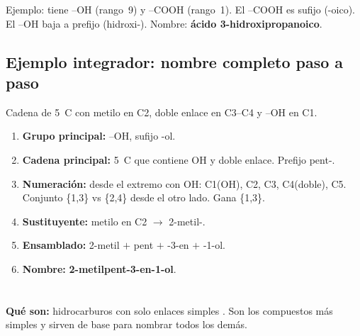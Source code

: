 Ejemplo:  tiene \mbox{--OH} (rango~9) y \mbox{--COOH} (rango~1).
El \mbox{--COOH} es sufijo (-oico). El \mbox{--OH} baja a prefijo (hidroxi-).
Nombre: \textbf{ácido 3-hidroxipropanoico}.

{}
\subsection*{\textcolor{blueunam}{Ejemplo integrador: nombre completo paso a paso}}

Cadena de 5~C con metilo en C2, doble enlace en C3--C4 y \mbox{--OH} en C1.

\begin{center}
\end{center}

\begin{enumerate}
\item \textbf{Grupo principal:} \mbox{--OH}, sufijo -ol.
\item \textbf{Cadena principal:} 5~C que contiene OH y doble enlace. Prefijo pent-.
\item \textbf{Numeración:} desde el extremo con OH: C1(OH), C2, C3, C4(doble), C5.
  Conjunto \{1,3\} vs \{2,4\} desde el otro lado. Gana \{1,3\}.
\item \textbf{Sustituyente:} metilo en C2 $\to$ 2-metil-.
\item \textbf{Ensamblado:} 2-metil $+$ pent $+$ -3-en $+$ -1-ol.
\item \textbf{Nombre:} \textbf{2-metilpent-3-en-1-ol}.
\end{enumerate}

\newpage



{}
\section*{\centering\fontsize{12}{18}}

\textbf{Qué son:} hidrocarburos con solo enlaces simples . Son los compuestos
más simples y sirven de base para nombrar todos los demás.

